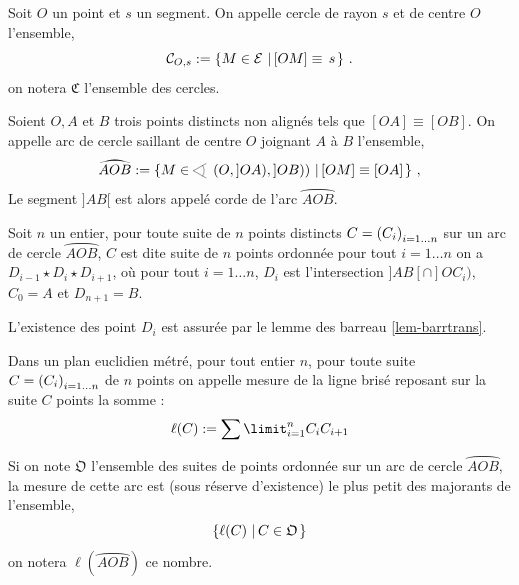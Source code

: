 \begin{defi}[Cercle]
    Soit $O$ un point et $s$ un segment. On appelle cercle de rayon $s$ et de centre $O$ l'ensemble,
    \begin{equation*}
        \mathcal{C}_{O,s}:=\left\{M\in \mathcal{E}\,\left|\, [OM]\equiv \, s\right.\right\}\,.
    \end{equation*}
    on notera $\mathfrak{C}$ l'ensemble des cercles. 
\end{defi}
\begin{defi}
Soient $O,A$ et $B$ trois points distincts non alignés tels que $[OA]\equiv [OB]$. On appelle arc de cercle saillant de centre $O$ joignant $A$ à $B$ l'ensemble,
\begin{equation*}
    \wideparen{AOB} :=\ensemble{M\in \anglesaillant\left(O,]OA),]OB)\right)}{[OM]\equiv [OA]}\,,
\end{equation*}
Le segment $]AB[$ est alors appelé corde de l'arc $\wideparen{AOB}$.
\end{defi}
\begin{defi}
Soit $n$ un entier, pour toute suite de $n$ points distincts $C = \left(C_{i}\right)_{i = 1\ldots n}$ sur un arc de cercle $\wideparen{AOB}$, $C$ est dite suite de $n$ points ordonnée \ssi pour tout $i= 1\ldots n $ on a $D_{i-1} \star D_i \star D_{i+1}$, où pour tout $i= 1 \ldots n$,  $D_i$ est l'intersection $]AB[\cap ]O C_i)$, $C_0=A$ et $D_{n+1}=B$.
\end{defi}
\begin{rema}
    L'existence des point $D_i$ est assurée par le lemme des barreau \ref{lem-barrtrans}.
\end{rema}
\begin{defi}
Dans un plan euclidien métré, pour tout entier $n$, pour toute suite $C = \left(C_{i}\right)_{i = 1\ldots n}$ de $n$ points on appelle mesure de la ligne brisé reposant sur la suite $C$ points la somme :
\begin{equation*}
    \ell(C) : = \sum\limit_{i=1}^n C_i C_{i+1}
\end{equation*}
\end{defi}
\begin{defi}
Si on note $\mathfrak{O}$ l'ensemble des suites de points ordonnée sur un arc de cercle $\wideparen{AOB}$, la mesure de cette arc est (sous réserve d'existence) le plus petit des majorants de l'ensemble,
\begin{equation*}
    \left\{\ell (C)\,\left|\,C\in \mathfrak{O}\right.\right\}
\end{equation*}
on notera $\ell\left(\wideparen{AOB}\right)$ ce nombre. 
\end{defi}
